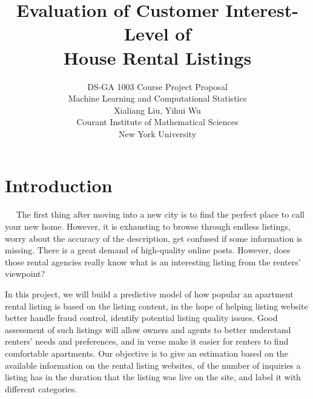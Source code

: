 \documentclass{article}
\begin{document}
{
\title{\bf Evaluation of Customer Interest-Level of \\ House Rental Listings \\\vspace{0.5em}}
\author{
        DS-GA 1003 Course Project Proposal \vspace{0.5em}\\
        Machine Learning and Computational Statistics  \vspace{2.0em}\\
        Xialiang Liu, Yihui Wu  \vspace{0.75em}\\
        Courant Institute of Mathematical Sciences \vspace{0.5em}\\
        New York University \\
\date{}
} 
\maketitle
}



\section{Introduction} \label{introsec}

~~ The first thing after moving into a new city is to find the perfect place to call your new home. However, it is exhausting to browse through endless listings, worry about the accuracy of the description, get confused if some information is missing. There is a great demand of high-quality online posts. However, does those rental agencies really know what is an interesting listing from the renters' viewpoint?

In this project, we will build a predictive model of how popular an apartment rental listing is based on the listing content, in the hope of helping listing website better handle fraud control, identify potential listing quality issues. Good assessment of such listings will allow owners and agents to better understand renters' needs and preferences, and in verse make it easier for renters to find comfortable apartments. Our objective is to give an estimation based on the available information on the rental listing websites, of the number of inquiries a listing has in the duration that the listing was live on the site, and label it with different categories.
\end{document}
